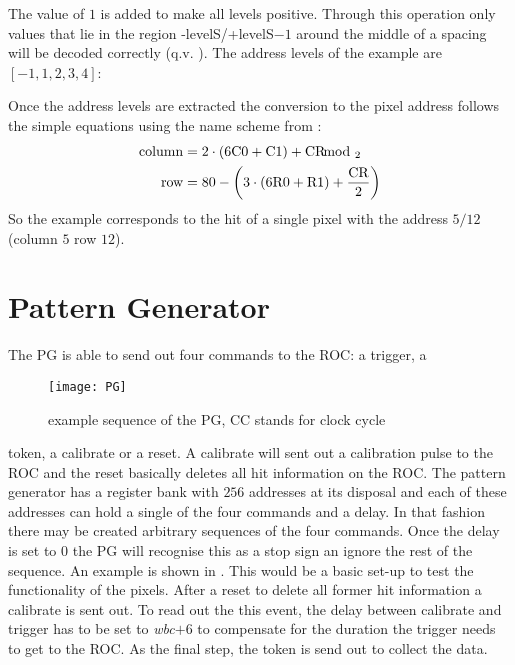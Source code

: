 The value of $1$ is added to make all levels positive. Through this operation only values that lie in the region -levelS/+levelS$-1$ around the middle of a spacing will be decoded correctly (q.v. ). The address levels of the example are $[-1, 1, 2, 3, 4]$:
\begin{center}
\terminal{[-264, -69, 29, -1, 1, 2, 3, 4, 43]}                                                    
\end{center}
Once the address levels are extracted the conversion to the pixel address follows the simple equations using the name scheme from :
\begin{align}
	\text{column} &= 	2\cdot\left(  6\text{C}0 + \text{C}1 \right) + \text{CR}\hspace*{-8pt}\mod_{2}\\
	\text{row} &= 80 - \left( 3\cdot\left(  6\text{R}0 + \text{R}1 \right) + \frac{\text{CR}}{2}\right)
\end{align}
So the example corresponds to the hit of a single pixel with the address $5/12$ (column $5$ row $12$).
\section{Pattern Generator}
The \ac{PG} is able to send out four commands to the \ac{ROC}: a trigger, a  
\begin{wrapfigure}{r}{3.3cm}
	\texttt{[image: PG]}
	\caption{example sequence of the \ac{PG}, CC stands for clock cycle}
	\label{p14}
\end{wrapfigure} 
token, a calibrate or a reset. A calibrate will sent out a calibration pulse to the \ac{ROC} and the reset basically deletes all hit information on the \ac{ROC}. The pattern generator has a register bank with $256$ addresses at its disposal and each of these addresses can hold a single of the four commands and a delay. In that fashion there may be created arbitrary sequences of the four commands. Once the delay is set to $0$ the \ac{PG} will recognise this as a stop sign an ignore the rest of the sequence. An example is shown in . This would be a basic set-up to test the functionality of the pixels. After a reset to delete all former hit information a calibrate is sent out. To read out the this event, the delay between calibrate and trigger has to be set to \textit{wbc}$+6$ to compensate for the duration the trigger needs to get to the \ac{ROC}. As the final step, the token is send out to collect the data.
